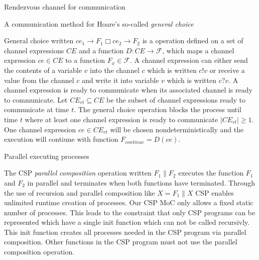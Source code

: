 \begin{requirement}\label{requirement-csp-rendezvous}
  Rendezvous channel for communication
\end{requirement}

\begin{requirement}\label{requirement-csp-general-choice}
  A communication method for Hoare's so-called \emph{general choice}
  
  General choice written $ce_{1} \to F_1 \Box ce_{2} \to F_2$
  is a operation defined on a set of channel expressions $CE$ and
  a function $D: CE \to \mathcal{F}$, which maps a channel expression
  $ce \in CE$ to a function $F_{x} \in \mathcal{F}$. A channel
  expression can either send the contents of a variable $v$ into
  the channel $c$ which is written $c!v$ or receive a value from
  the channel $c$ and write it into variable $v$ which is written
  $c?v$. A channel expression is ready to communicate when its
  associated channel is ready to communicate.
  Let $CE_{rt} \subseteq CE$ be the subset of channel expressions
  ready to communicate at time $t$. The general choice operation
  blocks the process until time $t$ where at least one channel expression
  is ready to communicate $|CE_{rt}| \ge 1$. One channel expression
  $ce \in CE_{rt}$ will be chosen nondeterministically and the
  execution will contiune with function $F_{continue} = D(ce)$.
\end{requirement}

\begin{requirement}\label{requirement-csp-concurrent-processes}
  Parallel executing processes
  
  The CSP \emph{parallel composition} operation written $F_1 \| F_2$ executes the
  function $F_1$ and $F_2$ in parallel and terminates when both functions
  have terminated. Through the use of recursion and parallel composition
  like $X = F_1 \| X$ CSP enables unlimited runtime creation of processes.
  Our CSP MoC only allows a fixed static number of processes. This
  leads to the constraint that only CSP programs can be represented which
  have a single init function which can not be called recursivly. This init
  function creates all processes needed in the CSP program via parallel composition.
  Other functions in the CSP program must not use the parallel composition
  operation.
\end{requirement}

%  

